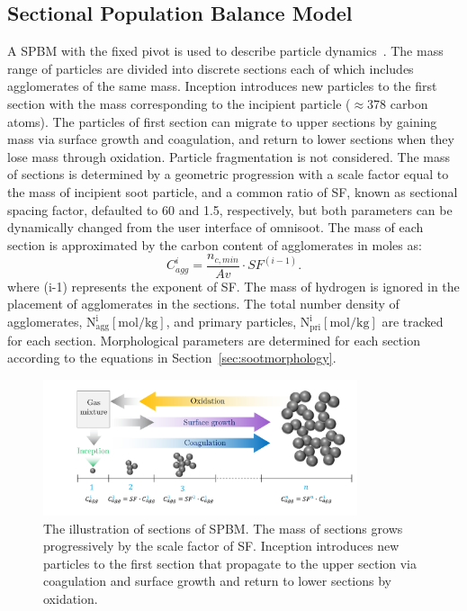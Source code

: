 \subsection{Sectional Population Balance Model}
A SPBM with the fixed pivot is used to describe particle dynamics~\citep{wu1988discrete}. The mass range of particles are divided into discrete sections each of which includes agglomerates of the same mass. Inception introduces new particles to the first section with the mass corresponding to the incipient particle ($\approx$378 carbon atoms). The particles of first section can migrate to upper sections by gaining mass via surface growth and coagulation, and return to lower sections when they lose mass through oxidation. Particle fragmentation is not considered. The mass of sections is determined by a geometric progression with a scale factor equal to the mass of incipient soot particle, and a common ratio of SF, known as sectional spacing factor, defaulted to 60 and 1.5, respectively, but both parameters can be dynamically changed from the user interface of omnisoot. The mass of each section is approximated by the carbon content of agglomerates in moles as:
\begin{equation}
	C^i_{agg} = \frac{n_{c,min}}{Av}\cdot SF^{(i-1)}
	\label{eqn:Caggsec}.
\end{equation}
\noindent where (i-1) represents the exponent of SF. The mass of hydrogen is ignored in the placement of agglomerates in the sections.
The total number density of agglomerates, $\mathrm{N^i_{agg} [mol/kg]}$, and primary particles, $\mathrm{N^i_{pri} [mol/kg]}$ are tracked for each section. Morphological parameters are determined for each section according to the equations in Section~\ref{sec:sootmorphology}.

\begin{figure}[!htbp]
	\centering
	\includegraphics[height=40mm, ]{Figures/Theory/Sectional.pdf}
	\caption{The illustration of sections of SPBM. The mass of sections grows progressively by the scale factor of SF. Inception introduces new particles to the first section that propagate to the upper section via coagulation and surface growth and return to lower sections by oxidation.}
	\label{fig:sectional}
\end{figure}

